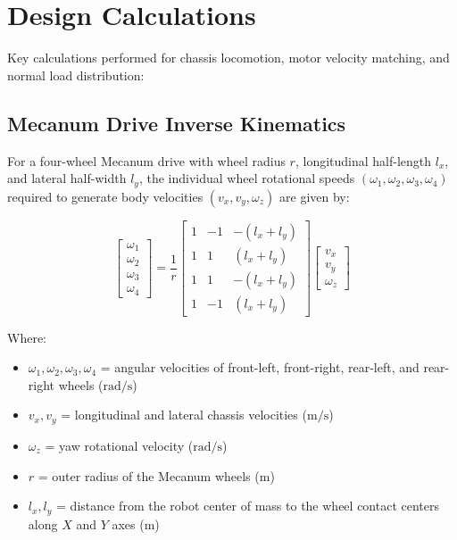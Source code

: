 \section{Design Calculations}
Key calculations performed for chassis locomotion, motor velocity matching, and normal load distribution:

\subsection*{Mecanum Drive Inverse Kinematics}
For a four-wheel Mecanum drive with wheel radius $r$, longitudinal half-length $l_x$, and lateral half-width $l_y$, the individual wheel rotational speeds $(\omega_1, \omega_2, \omega_3, \omega_4)$ required to generate body velocities $(v_x, v_y, \omega_z)$ are given by:

\begin{equation}
    \begin{bmatrix}
        \omega_1 \\
        \omega_2 \\
        \omega_3 \\
        \omega_4
    \end{bmatrix}
    = \frac{1}{r}
    \begin{bmatrix}
        1 & -1 & -(l_x + l_y) \\
        1 &  1 &  (l_x + l_y) \\
        1 &  1 & -(l_x + l_y) \\
        1 & -1 &  (l_x + l_y)
    \end{bmatrix}
    \begin{bmatrix}
        v_x \\
        v_y \\
        \omega_z
    \end{bmatrix}
\end{equation}

Where:
\begin{itemize}
    \item $\omega_1, \omega_2, \omega_3, \omega_4$ = angular velocities of front-left, front-right, rear-left, and rear-right wheels ($\text{rad/s}$)
    \item $v_x, v_y$ = longitudinal and lateral chassis velocities ($\text{m/s}$)
    \item $\omega_z$ = yaw rotational velocity ($\text{rad/s}$)
    \item $r$ = outer radius of the Mecanum wheels ($\text{m}$)
    \item $l_x, l_y$ = distance from the robot center of mass to the wheel contact centers along $X$ and $Y$ axes ($\text{m}$)
\end{itemize}

